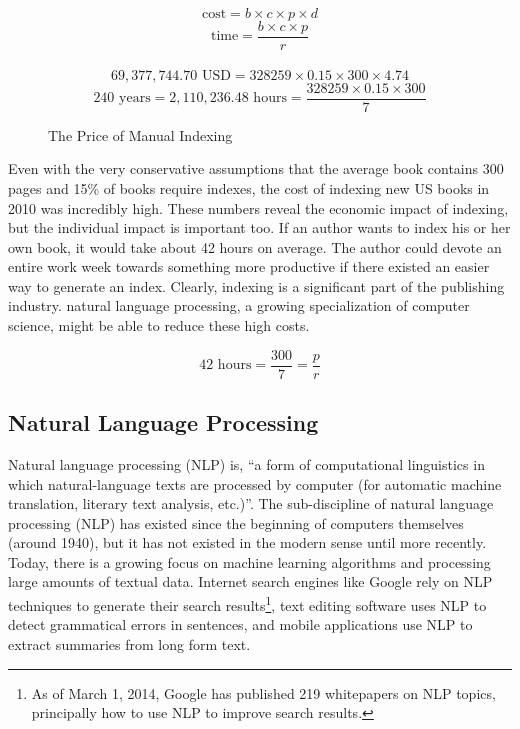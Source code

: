 \begin{figure}[H]
$$ \text{cost} = b \times c \times p \times d $$
$$ \text{time} = \frac{b \times c \times p}{r} $$
\\
$$ 69,377,744.70 \text{ USD} = 328259 \times 0.15 \times 300 \times 4.74 $$
$$ 240 \text{ years}= 2,110,236.48 \text{ hours} = \frac{328259 \times 0.15 \times 300}{7}$$
\caption{The Price of Manual Indexing}
\end{figure}

Even with the very conservative assumptions that the average book contains 300 pages and 15\% of books require indexes, the cost of indexing new US books in 2010 was incredibly high.
These numbers reveal the economic impact of indexing, but the individual impact is important too.
If an author wants to index his or her own book, it would take about 42 hours on average. The author could devote an entire work week towards something more productive if there existed an easier way to generate an index.
Clearly, indexing is a significant part of the publishing industry.
natural language processing, a growing specialization of computer science, might be able to reduce these high costs.

\begin{figure}
$$ 42 \text{ hours} = \frac{300}{7} = \frac{p}{r}$$
\end{figure}

\subsection{Natural Language Processing}

Natural language processing (NLP) is, ``a form of computational linguistics in which natural-language texts are processed by computer (for automatic machine translation, literary text analysis, etc.)''\cite{oed-nlp}.
The sub-discipline of natural language processing (NLP) has existed since the beginning of computers themselves (around 1940), but it has not existed in the modern sense until more recently.
Today, there is a growing focus on machine learning algorithms and processing large amounts of textual data\cite{jurafsky}.
Internet search engines like Google rely on NLP techniques to generate their search results\footnote{As of March 1, 2014, Google has published 219 whitepapers on NLP topics, principally how to use NLP to improve search results.\cite{google-nlp}}, text editing software uses NLP to detect grammatical errors in sentences\cite{norvig}, and mobile applications use NLP to extract summaries from long form text\cite{bit-of-news}.




